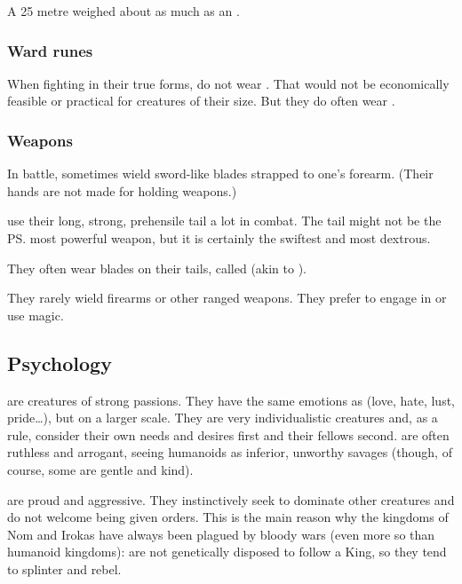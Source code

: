 A 25 metre \dragon weighed about as much as an . 





\subsubsection{Ward runes}
When fighting in their true forms, \dragons{} do not wear \armour. 
That would not be economically feasible or practical for creatures of their size. 
But they do often wear . 





\subsubsection{Weapons}
\index{\skekrathuin}
In battle, \dragons{} sometimes wield \skekrathuins{}\dash sword-like blades strapped to one's forearm. 
(Their hands are not made for holding weapons.)

\Dragons{} use their long, strong, prehensile tail a lot in combat. 
The tail might not be the \ps{\dragon} most powerful weapon, but it is certainly the swiftest and most dextrous. 

\index{\zrekklakh}
They often wear blades on their tails, called \zrekklakh{} (akin to ). 

They rarely wield firearms or other ranged weapons. 
They prefer to engage in \melee{} or use magic. 









\subsection{Psychology}
\Dragons{} are creatures of strong passions. They have the same emotions as \humans{} (love, hate, lust, pride\ldots{}), but on a larger scale. They are very individualistic creatures and, as a rule, consider their own needs and desires first and their fellows second.
\Dragons{} are often ruthless and arrogant, seeing humanoids as inferior, unworthy savages (though, of course, some \dragons{} are gentle and kind). 

\Dragons{} are proud and aggressive. They instinctively seek to dominate other creatures and do not welcome being given orders. This is the main reason why the \draconic{} kingdoms of Nom and Irokas have always been plagued by bloody wars (even more so than humanoid kingdoms): \Dragons{} are not genetically disposed to follow a King, so they tend to splinter and rebel. 

